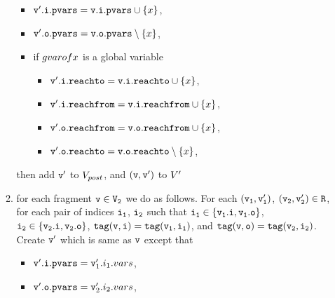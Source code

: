 \begin{itemize}
\begin{enumerate}
\begin{itemize}
\item $\mathtt{v}'.\mathtt{i}.\mathtt{pvars} = \mathtt{v}.\mathtt{i}.\mathtt{pvars} \cup \left\{x\right\}$,
\item $\mathtt{v}'.\mathtt{o}.\mathtt{pvars} = \mathtt{v}.\mathtt{o}.\mathtt{pvars} \setminus \left\{x\right\}$,
\item if $\\gvarof{x}$ is a global variable
\begin{itemize}
\item $\mathtt{v}'.\mathtt{i}.\mathtt{reachto} = \mathtt{v}.\mathtt{i}.\mathtt{reachto} \cup \left\{x\right\}$,
 \item $\mathtt{v}'.\mathtt{i}.\mathtt{reachfrom} = \mathtt{v}.\mathtt{i}.\mathtt{reachfrom} \cup \left\{x\right\}$,
\item $\mathtt{v}'.\mathtt{o}.\mathtt{reachfrom} = \mathtt{v}.\mathtt{o}.\mathtt{reachfrom} \cup \left\{x\right\}$,
\item $\mathtt{v}'.\mathtt{o}.\mathtt{reachto} = \mathtt{v}.\mathtt{o}.\mathtt{reachto} \setminus \left\{x\right\}$,
\end{itemize}
\end{itemize}
then add $\tt v'$ to $V_{post}$, and $\tt (v,v')$ to $V'$
\item for each fragment $\tt v \in V_2$ we do as follows. For each $\tt (\mathtt{v}_1,\mathtt{v}_1')$, $\tt (\mathtt{v}_2,\mathtt{v}_2') \in R$, for each pair of indices $\tt i_1$, $\tt i_2$ such that $\tt i_1 \in \{\mathtt{v}_1.i, \mathtt{v}_1.o\}$, $\tt i_2 \in \{\mathtt{v}_2.i, \mathtt{v}_2.o\}$, $\tt tag(v,i) = tag(\mathtt{v}_1, i_1)$, and $\tt tag(v,o) = tag(\mathtt{v}_2, i_2)$. Create $\tt v'$ which is same as $\tt v$ except that 
\begin{itemize}
\item $\mathtt{v}'.\mathtt{i}.\mathtt{pvars} = \mathtt{v}_1'.i_1.vars$,
\item $\mathtt{v}'.\mathtt{o}.\mathtt{pvars} = \mathtt{v}_2'.i_2.vars$,


\end{itemize}
\end{enumerate}
\end{itemize}
